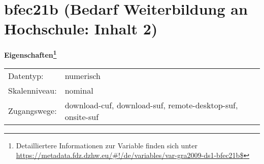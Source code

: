 
    \setcounter{footnote}{0}

    \vspace*{-1.8cm}
	\section{bfec21b (Bedarf Weiterbildung an Hochschule: Inhalt 2)}
	\label{section:bfec21b}



    \vspace*{0.5cm}
    \noindent\textbf{Eigenschaften\footnote{Detailliertere Informationen zur Variable finden sich unter
		\url{https://metadata.fdz.dzhw.eu/\#!/de/variables/var-gra2009-ds1-bfec21b$}}}\\
	\begin{tabularx}{\hsize}{@{}lX}
	Datentyp: & numerisch \\
	Skalenniveau: & nominal \\
	Zugangswege: &
	  download-cuf, 
	  download-suf, 
	  remote-desktop-suf, 
	  onsite-suf
 \\
    \end{tabularx}



